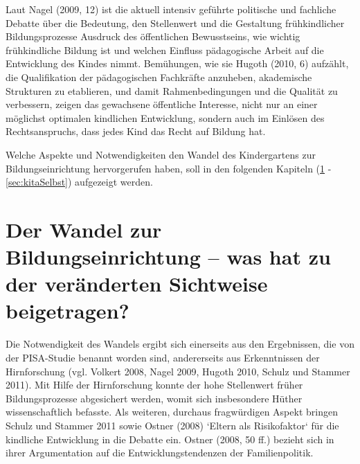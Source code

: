 Laut Nagel (2009, 12) ist die aktuell intensiv geführte politische und fachliche Debatte über die Bedeutung, den Stellenwert und die Gestaltung frühkindlicher Bildungsprozesse Ausdruck des öffentlichen Bewusstseins, wie wichtig frühkindliche Bildung ist und welchen Einfluss pädagogische Arbeit auf die Entwicklung des Kindes nimmt. Bemühungen, wie sie Hugoth (2010, 6) aufzählt, die Qualifikation der pädagogischen Fachkräfte anzuheben, akademische Strukturen zu etablieren, und damit Rahmenbedingungen und die Qualität zu verbessern, zeigen das gewachsene öffentliche Interesse, nicht nur an einer möglichst optimalen kindlichen Entwicklung, sondern auch im Einlösen des Rechtsanspruchs, dass jedes Kind das Recht auf Bildung hat. 

Welche Aspekte und Notwendigkeiten den Wandel des Kindergartens zur Bildungseinrichtung hervorgerufen haben, soll in den folgenden Kapiteln (\ref{sec:kitaWandel} - \ref{sec:kitaSelbst}) aufgezeigt werden. 

\section{Der Wandel zur Bildungseinrichtung – was hat zu der veränderten Sichtweise beigetragen?}\label{sec:kitaWandel}
Die Notwendigkeit des Wandels ergibt sich einerseits aus den Ergebnissen, die von der PISA-Studie benannt worden sind, andererseits aus Erkenntnissen der Hirnforschung (vgl. Volkert 2008, Nagel 2009, Hugoth 2010, Schulz und Stammer 2011). Mit Hilfe der Hirnforschung konnte der hohe Stellenwert früher Bildungsprozesse abgesichert werden, womit sich insbesondere Hüther wissenschaftlich befasste. Als weiteren, durchaus fragwürdigen Aspekt bringen Schulz und Stammer 2011 sowie Ostner (2008) ‘Eltern als Risikofaktor‘ für die kindliche Entwicklung in die Debatte ein. Ostner (2008, 50 ff.) bezieht sich in ihrer Argumentation auf die Entwicklungstendenzen der Familienpolitik. 

